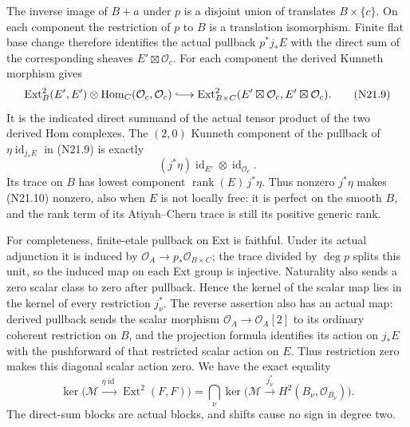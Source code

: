 The inverse image of $B+a$ under $p$ is a disjoint union
of translates $B\times\{c\}$. On each component the
restriction of $p$ to $B$ is a translation isomorphism.
Finite flat base change therefore identifies the actual
pullback $p^*j_*E$ with the direct sum of the corresponding
sheaves $E'\boxtimes\mathcal O_c$. For each component the
derived Kunneth morphism gives
\[
 \operatorname{Ext}^2_B(E',E')\otimes
          \operatorname{Hom}_C(\mathcal O_c,\mathcal O_c)
       \lhook\joinrel\longrightarrow
 \operatorname{Ext}^2_{B\times C}
       (E'\boxtimes\mathcal O_c,E'\boxtimes\mathcal O_c).
                                                               \tag{N21.9}
\]
It is the indicated direct summand of the actual tensor
product of the two derived Hom complexes.
The $(2,0)$ Kunneth component of the pullback of
$\eta\operatorname{id}_{j_*E}$ in (N21.9) is exactly
\[
                    (j^*\eta)\operatorname{id}_{E'}
                                  \otimes\operatorname{id}_{\mathcal O_c}.
                                                               \tag{N21.10}
\]
Its trace on $B$ has lowest component
$\operatorname{rank}(E)\,j^*\eta$. Thus nonzero $j^*\eta$
makes (N21.10) nonzero, also when $E$ is not locally free:
it is perfect on the smooth $B$, and the rank term of
its Atiyah--Chern trace is still its positive generic rank.

For completeness, finite-etale pullback on Ext is faithful.
Under its actual adjunction it is induced by
$\mathcal O_A\to p_*\mathcal O_{B\times C}$; the trace
divided by $\deg p$ splits this unit, so the induced map
on each Ext group is injective. Naturality also sends a
zero scalar class to zero after pullback. Hence
the kernel of the scalar map lies in the kernel of every
restriction $j_\nu^*$. The reverse assertion also has an
actual map: derived pullback sends the scalar morphism
$\mathcal O_A\to\mathcal O_A[2]$ to its ordinary coherent
restriction on $B$, and the projection formula identifies
its action on $j_*E$ with the pushforward of that restricted
scalar action on $E$. Thus restriction zero makes this
diagonal scalar action zero. We have the exact equality
\[
 \ker\bigl(\mathcal M\xrightarrow{\eta\operatorname{id}}
                       \operatorname{Ext}^2(F,F)\bigr)
     =\bigcap_\nu
       \ker\bigl(\mathcal M\xrightarrow{j_\nu^*}
                     H^2(B_\nu,\mathcal O_{B_\nu})\bigr).
                                                               \tag{N21.11}
\]
The direct-sum blocks are actual blocks, and shifts cause
no sign in degree two.


